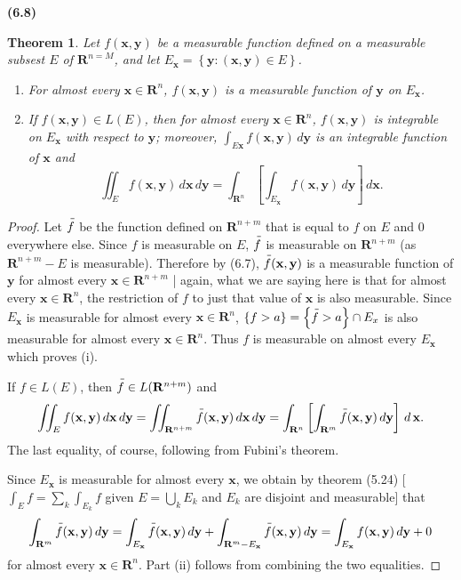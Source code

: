 \documentclass[12pt]{book}
\renewcommand{\vec}[1]{\mathbf{#1}}
\newcommand{\st}{\bf{:}}
\newcommand{\set}[1]{\left\{ #1 \right\}}
\renewcommand{\i}{\cap}
\newcommand{\bu}{\bigcup}
\newcommand{\ee}{\end{enumerate}}
\newcommand{\bei}{\begin{enumerate}[label = (\roman*)]}
\newcommand{\R}{\mathbf{R}}
\renewcommand{\.}{\mkern1mu}
\newenvironment{pf}{\begin{proof}\setlength{\parindent}{\normalparindent}\setlength{\parskip}{\normalparskip}}{\end{proof}}
\theoremstyle{theorem}
\newtheorem{theorem}{Theorem}
\newcommand{\thmindent}{\setlength{\parindent}{17pt}}
\newenvironment{thm}[1]
	{\noindent \textbf{#1}\hspace{2ex}\begin{minipage}[t]{\linewidth - \widthof{\textbf{(#1)}}}  \begin{theorem}\thmindent }
	{\end{theorem}\end{minipage}\medskip}
\renewcommand{\bf}[1]{\boldsymbol{#1}}
\renewcommand{\bar}[1]{\overset{\hspace{3pt}\rule[0.5pt]{\widthof{#1}}  
	{0.1ex}}{#1}}
\newlength{\normalparindent}
\newlength{\normalparskip}
\begin{document}
	\begin{thm}{(6.8)}
		Let $f(\vec x, \vec y)$ be a measurable function defined on a measurable subsest $E$ of $\R^{n=M}$, and let $E_\vec x = \set{\vec y \st (\vec x, \vec y) \in E}$.
		\bei
			\item For almost every $\vec x \in \R^n$, $f(\vec x, \vec y)$ is a measurable function of $\vec y$ on $E_\vec x$.
			\item If $f(\vec x, \vec y) \in L(E)$, then for almost every $\vec x \in \R^n$, $f(\vec x, \vec y)$ is integrable on $E_\vec x$ with respect to $\vec y$; moreover, $\int_{E\vec x} f(\vec x, \vec y) \, d\vec y$ is an integrable function of $\vec x$ and 
			\[
				\iint_E f(\vec x, \vec y)\, d\vec x\, d\vec y = \int_{\R^n} \left[ \int_{E_\vec x} f(\vec x, \vec y) \, d\vec y\right]\, d\vec x.
			\] 
		\ee
	\end{thm}
	\begin{pf}
		Let $\bar{f}$ be the function defined on $\R^{n+m}$ that is equal to $f$ on $E$ and 0 everywhere else. Since $f$ is measurable on $E$, $\bar{f}$ is measurable on $\R^{n+m}$ (as $\R^{n+m} - E$ is measurable). Therefore by (6.7), $\bar{f}(\vec x, \vec y)$ is a measurable function of $\vec y$ for almost every $\vec x\in \R^{n+m}$ | again, what we are saying here is that for almost every $\vec x \in \R^n$, the restriction of $f$ to just that value of $\vec x$ is also measurable. Since $E_\vec x$ is measurable for almost every $\vec x \in \R^n$, $\set{f > a} = \set{\bar{f} >a} \i E_x$ is also measurable for almost every $\vec x \in \R^n$. Thus $f$ is measurable on almost every $E_\vec x$ which proves (i).
		
		If $f \in L(E)$, then $\bar{f} \in L(\R^{n+m})$ and
			\[
				\iint_E f(\vec x, \vec y)\, d\vec x\, d\vec y = \iint_{\R^{n+m}} \bar{f}(\vec x, \vec y)\, d\vec x\, d\vec y = \int_{\R^n} \left[ \int_{\R^m} \bar{f}(\vec x, \vec y)\, d\vec y \right] \, d\,\vec x.
			\]
		The last equality, of course, following from Fubini's theorem. 
		
		Since $E_\vec x$ is measurable for almost every $\vec x$, we obtain by theorem (5.24) [$\int_E f = \sum_k \int_{E_k} f$ given $E = \bu_k E_k$ and $E_k$ are disjoint and measurable] that 
			\[
				\int_{\R^m} \bar{f}(\vec x, \vec y)\, d\vec y = \int_{E_\vec x}\bar{f}(\vec x, \vec y)\, d\vec y + \int_{\R^m - E_\vec x} \bar{f}(\vec x, \vec y)\, d\vec y = \int_{E_\vec x} f(\vec x, \vec y)\, d\vec y + 0
			\]
		for almost every $\vec x\in \R^n$. Part (ii) follows from combining the two equalities.
	\end{pf}
	
\end{document}
